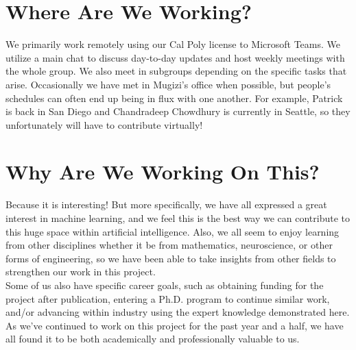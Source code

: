 \documentclass{article}
\begin{document}
\section*{Where Are We Working?}

\begin{figure}
    \centering
    {%
	   \setlength{\fboxsep}{0pt}%
	   \setlength{\fboxrule}{0pt}%
	 }%
\end{figure} \hfill

We primarily work remotely using our Cal Poly license to Microsoft Teams. We utilize a main chat to discuss day-to-day updates and host weekly meetings with the whole group. We also meet in subgroups depending on the specific tasks that arise. Occasionally we have met in Mugizi's office when possible, but people's schedules can often end up being in flux with one another. For example, Patrick is back in San Diego and Chandradeep Chowdhury is currently in Seattle, so they unfortunately will have to contribute virtually!

\section*{Why Are We Working On This?}

\hfill

Because it is interesting! But more specifically, we have all expressed a great interest in machine learning, and we feel this is the best way we can contribute to this huge space within artificial intelligence. Also, we all seem to enjoy learning from other disciplines whether it be from mathematics, neuroscience, or other forms of engineering, so we have been able to take insights from other fields to strengthen our work in this project. \\

Some of us also have specific career goals, such as obtaining funding for the project after publication, entering a Ph.D. program to continue similar work, and/or advancing within industry using the expert knowledge demonstrated here. As we've continued to work on this project for the past year and a half, we have all found it to be both academically and professionally valuable to us.
\end{document}
